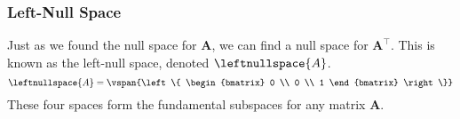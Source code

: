 \documentclass{article}
\begin{document}
\subsubsection{Left-Null Space}
Just as we found the null space for \(\symbf{A}\), we can find a null space for \(\symbf{A}^\top\).
This is known as the left-null space, denoted \(\leftnullspace{A}\).
\begin{equation*}
    \leftnullspace{A} =
    \vspan{\left\{
        \begin{bmatrix}
            0 \\
            0 \\
            1
        \end{bmatrix}
        \right\}}
\end{equation*}
These four spaces form the fundamental subspaces for any matrix \(\symbf{A}\).
\end{document}
